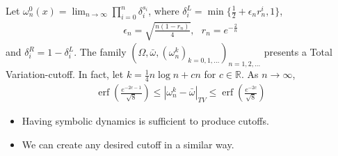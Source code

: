\documentclass[12pt,t]{beamer}
\DeclareMathOperator{\erf}{erf} \DeclareMathOperator{\prob}{Prob}
\begin{document}
\begin{frame}

   \begin{theorem}
   Let $\omega_n^0(x) = \lim_{n \rightarrow \infty} \prod_{i=0}^n \delta^{s_i}_i $, where $\delta_i^L
=\min\{\frac{1}{2}+\epsilon_n r_n^i,1\}$,
  \begin{align}
    \epsilon_n = \sqrt{\frac{n(1-r_n)}{4}}, \,\,\,\,
             r_n = e^{-\frac{2}{n}}
 \end{align}
and $\delta_i^R= 1-\delta_i^L$. The family $(\Omega,\bar{\omega},(\omega^k_n)_{k=0,1,...})_{n=1,2,...}$ presents a Total Variation-cutoff.
In fact, let $k = \frac{1}{4}n\log{n}+cn $ for $c\in \mathbb{R}$. As $n\rightarrow \infty$,
\begin{eqnarray*}
\label{erfbound}
          \erf \left(\frac{e^{-2c-1}}{\sqrt{8}}\right)\le  |\omega^k_n - \bar{\omega} |_{TV} \le \erf \left(\frac{e^{-2c}}{\sqrt{8}}\right)
\end{eqnarray*}
\end{theorem}
  \begin{itemize}
   \item Having symbolic dynamics is sufficient to produce cutoffs.
   \item We can create any desired cutoff in a similar way.
  \end{itemize}
\end{frame}
\end{document}

